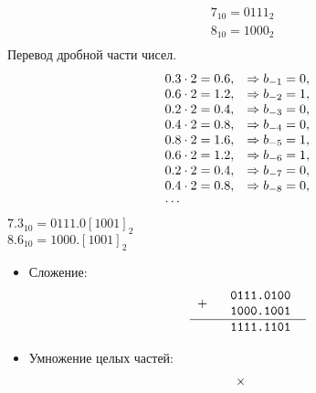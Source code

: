\documentclass[oneside,a4paper,14pt]{extarticle} %
\begin{document}
\begin{enumerate}
            $$
                \begin{array}{cc}
                    & 7_{10} = 0111_{2}\\
                    & 8_{10} = 1000_{2}\\ 
                \end{array}
            $$
            Перевод дробной части чисел.
            $$
                \begin{array}[c]{ll}
                    0.3 \cdot 2 = 0.6,   &\Rightarrow b_{-1}=0, \\
                    0.6 \cdot 2 = 1.2,   &\Rightarrow b_{-2}=1, \\
                    0.2 \cdot 2 = 0.4,   &\Rightarrow b_{-3}=0, \\
                    0.4 \cdot 2 = 0.8,   &\Rightarrow b_{-4}=0, \\
                    0.8 \cdot 2 = 1.6,   &\Rightarrow b_{-5}=1, \\
                    0.6 \cdot 2 = 1.2,   &\Rightarrow b_{-6}=1, \\
                    0.2 \cdot 2 = 0.4,   &\Rightarrow b_{-7}=0, \\
                    0.4 \cdot 2 = 0.8,   &\Rightarrow b_{-8}=0, \\
                    \cdots
                \end{array}
            $$
            $7.3_{10} = 0111.0[1001]_{2}$\\
            $8.6_{10} = 1000.[1001]_{2}$
            \begin{itemize}
                \item Сложение:
                $$
                    \begin{tabular}{{c}{c}}
                    \texttt{$+$ }&
                    \begin{tabular}{c}
                    \texttt{0111.0100}\\
                    \texttt{1000.1001}\\
                    \end{tabular} \\ 
                    \hline
                    & \texttt{1111.1101}\\
                    \end{tabular}
                $$
                \item Умножение целых частей:
                $$
                    \begin{tabular}{{c}{c}}
                    \texttt{$\times$ }&

\end{tabular}$$
\end{itemize}
\end{enumerate}
\end{document}
